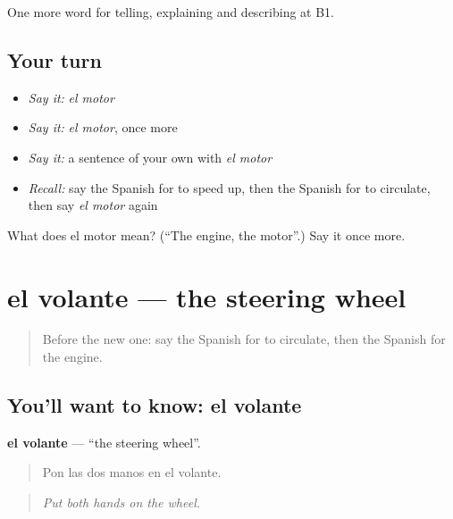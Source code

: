 \begin{grammarlens}[title={What you've built}]
One more word for telling, explaining and describing at B1.
\end{grammarlens}

\subsection*{Your turn}
\begin{itemize}
\raggedright
  \item \emph{Say it:} \emph{el motor}
  \item \emph{Say it:} \emph{el motor}, once more
  \item \emph{Say it:} a sentence of your own with \emph{el motor}
  \item \emph{Recall:} say the Spanish for to speed up, then the Spanish for to circulate, then say \emph{el motor} again
\end{itemize}

\begin{tcolorbox}[breakable,colback=teal!4,colframe=teal!35!black,title={Before you move on}]
What does el motor mean? (\textquotedblleft{}The engine, the motor\textquotedblright{}.) Say it once more.
\end{tcolorbox}
\section[el volante]{el volante — the steering wheel}

\label{lesson:ES-C644-volante}



\begin{quote}
Before the new one: say the Spanish for to circulate, then the Spanish for the engine.
\end{quote}

\subsection*{You'll want to know: el volante}
\textbf{el volante} — \textquotedblleft{}the steering wheel\textquotedblright{}.

\begin{quote}
Pon las dos manos en el volante.
\end{quote}

\begin{quote}
\emph{Put both hands on the wheel.}
\end{quote}

